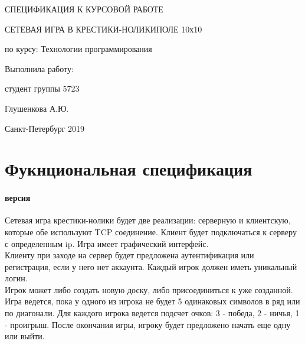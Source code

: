 \documentclass[a4paper,14pt]{report}
\begin{document}
	\begin{titlepage}
			\begin{center}
				СПЕЦИФИКАЦИЯ К КУРСОВОЙ РАБОТЕ
				\par
				\vspace{4cm}
				\huge
				{СЕТЕВАЯ ИГРА В КРЕСТИКИ-НОЛИКИ ПОЛЕ 10х10\par}
				\vspace{2cm}
				\normalsize по курсу: Технологии программирования
			\end{center}
		\vspace{5cm}
		\begin{flushleft} 
			Выполнила работу:\par
			студент группы 5723\par
			Глушенкова А.Ю.
		\end{flushleft}
		\begin{center}
			\vspace{3cm}
			Санкт-Петербург 2019
		\end{center}
	\end{titlepage}

	\newpage
	\section*{Фукнциональная спецификация}
	\paragraph{ версия\\}
	\normalsize
		Сетевая игра крестики-нолики будет две реализации: серверную и клиентскую, которые обе используют TCP соединение. Клиент будет подключаться к серверу с определенным ip. Игра имеет графический интерфейс.\\ 
		Клиенту при заходе на сервер будет предложена аутентификация или регистрация, если у него нет аккаунта. Каждый игрок должен иметь уникальный логин.\\
		Игрок может либо создать новую доску, либо присоединиться к уже созданной. Игра ведется, пока у одного из игрока не будет 5 одинаковых символов в ряд или по диагонали. Для каждого игрока ведется подсчет очков: 3 - победа, 2 - ничья, 1 - проигрыш. После окончания игры, игроку будет предложено начать еще одну или выйти. 
		
		
	\vspace{1cm}
	\paragraph{\large\\}
	\normalsize

	
\end{document}

